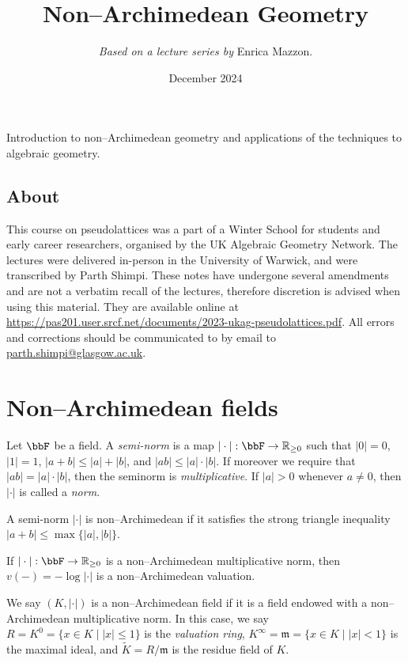 \title{Non--Archimedean Geometry}
\author{\textit{Based on a lecture series by }Enrica Mazzon.}
\date{December 2024}
\maketitle

Introduction to non--Archimedean geometry and applications of the
techniques to algebraic geometry.

\subsection{About} This course on pseudolattices was a part of a Winter
School for students and early career researchers, organised by the UK Algebraic
Geometry Network. The lectures were delivered in-person in the University of
Warwick, and were transcribed by Parth Shimpi. These notes have undergone
several amendments and are not a verbatim recall of the lectures, therefore
discretion is advised when using this material. They are available online at
\url{https://pas201.user.srcf.net/documents/2023-ukag-pseudolattices.pdf}.
All errors and corrections should be communicated to by email to
\url{parth.shimpi@glasgow.ac.uk}.

\section{Non--Archimedean fields}
Let \(\bbF\) be a field. A \emph{semi-norm} is a map \(|\cdot|:\bbF\to
\mathbb{R}_{\geq 0}\) such that \(|0|=0\), \(|1|=1\), \(|a+b|\leq |a|+|b|\), and
\(|ab|\leq |a|\cdot |b|\). If moreover we require that \(|ab|=|a|\cdot |b|\),
then the seminorm is \emph{multiplicative}. If \(|a|>0\) whenever \(a\neq 0\), then \(|\cdot |\) is called a \emph{norm}.

A semi-norm \(|\cdot |\) is non--Archimedean if it satisfies the strong triangle
inequality \(|a+b|\leq \max\{|a|,|b|\}\).

\begin{remark}
If \(|\cdot|:\bbF\to \mathbb{R}_{\geq 0}\) is a non--Archimedean multiplicative
norm, then \(v(-)=-\log |\cdot |\) is a non--Archimedean valuation.
\end{remark}

We say \((K,|\cdot|)\) is a non--Archimedean field if it is a field endowed with
a non--Archimedean multiplicative norm. In this case, we say \(R=K^0=\{x\in
K\;|\; |x|\leq 1\}\) is the \emph{valuation ring},
\(K^\infty=\mathfrak{m}=\{x\in K\;|\; |x|<1\}\) is the maximal ideal, and
\(\tilde K = R/\mathfrak{m}\) is the residue field of \(K\).

